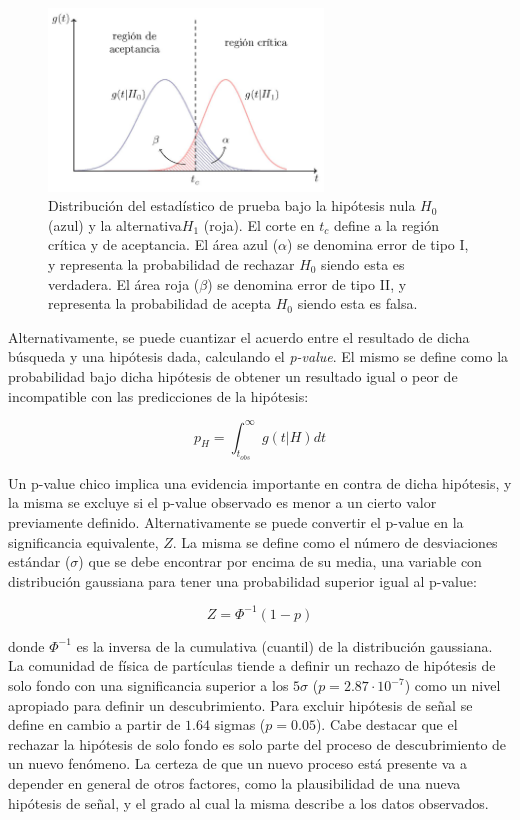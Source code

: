 \begin{figure}
  \centering
  \includegraphics[width=0.65\textwidth]{images_tmp/nullh.png}
  \caption{Distribución del estadístico de prueba bajo la hipótesis nula $H_0$ (azul) y la alternativa$H_1$ (roja). El corte en $t_c$ define a la región crítica y de aceptancia. El área azul ($\alpha$) se denomina error de tipo I, y representa la probabilidad de rechazar $H_0$ siendo esta es verdadera. El área roja ($\beta$) se denomina error de tipo II, y representa la probabilidad de acepta $H_0$ siendo esta es falsa. }
  \label{fig:nullh}
\end{figure}


Alternativamente, se puede cuantizar el acuerdo entre el resultado de dicha búsqueda y una hipótesis dada, calculando el \textit{p-value}. El mismo se define como la probabilidad bajo dicha hipótesis de obtener un resultado igual o peor de incompatible con las predicciones de la hipótesis:

\begin{equation}
	p_H = \int_{t_{obs}}^{\infty} g(t|H)dt
\end{equation}

Un p-value chico implica una evidencia importante en contra de dicha hipótesis, y la misma se excluye si el p-value observado es menor a un cierto valor previamente definido.  Alternativamente se puede convertir el p-value en la significancia equivalente, $Z$. La misma se define como el número de desviaciones estándar ($\sigma$) que se debe encontrar por encima de su media, una variable con distribución gaussiana para tener una probabilidad superior igual al p-value:

\begin{equation}
	Z=\Phi^{-1}(1-p)
\end{equation}

\noindent
donde $\Phi^{-1}$ es la inversa de la cumulativa (cuantil) de la distribución gaussiana. La comunidad de física de partículas tiende a definir un rechazo de hipótesis de solo fondo con una significancia superior a los $5\sigma$ ($p=2.87 \cdot 10^{-7}$) como un nivel apropiado para definir un descubrimiento. Para excluir hipótesis de señal se define en cambio a partir de $1.64$ sigmas ($p=0.05$). Cabe destacar que el rechazar la hipótesis de solo fondo es solo parte del proceso de descubrimiento de un nuevo fenómeno. La certeza de que un nuevo proceso está presente va a depender en general de otros factores, como la plausibilidad de una nueva hipótesis de señal, y el grado al cual la misma describe a los datos observados.


